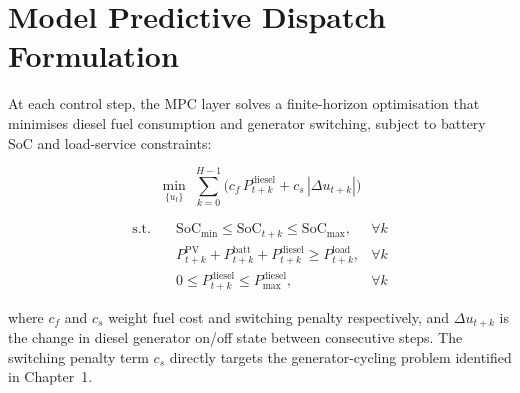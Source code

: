 \section{Model Predictive Dispatch Formulation}
At each control step, the MPC layer solves a finite-horizon optimisation that minimises diesel
fuel consumption and generator switching, subject to battery SoC and load-service constraints:

\begin{equation}
\min_{\{u_t\}} \; \sum_{k=0}^{H-1} \Big( c_f \, P^{\text{diesel}}_{t+k} +
c_s \, \left| \Delta u_{t+k} \right| \Big)
\label{eq:objective}
\end{equation}

\begin{align}
\text{s.t.} \quad
& \text{SoC}_{\min} \le \text{SoC}_{t+k} \le \text{SoC}_{\max}, & \forall k \label{eq:soc} \\
& P^{\text{PV}}_{t+k} + P^{\text{batt}}_{t+k} + P^{\text{diesel}}_{t+k} \ge P^{\text{load}}_{t+k},
  & \forall k \label{eq:balance} \\
& 0 \le P^{\text{diesel}}_{t+k} \le P^{\text{diesel}}_{\max}, & \forall k \label{eq:dieselcap}
\end{align}

\noindent
where $c_f$ and $c_s$ weight fuel cost and switching penalty respectively, and $\Delta
u_{t+k}$ is the change in diesel generator on/off state between consecutive steps. The
switching penalty term $c_s$ directly targets the generator-cycling problem identified in
Chapter~1.
